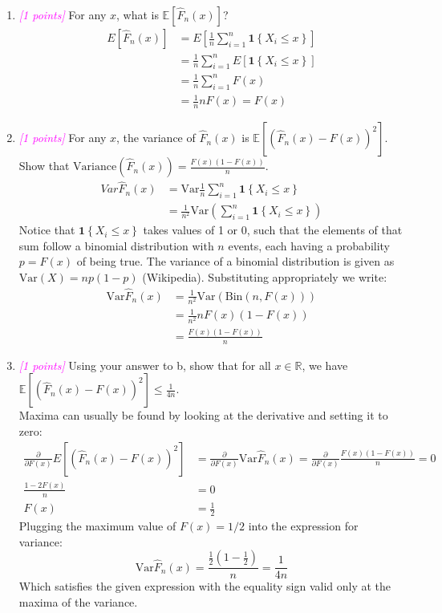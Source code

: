 \documentclass{article}
\newcommand{\field}[1]{\mathbb{#1}}
\newcommand{\1}{\mathbf{1}}
\newcommand{\E}{\mathbb{E}}
\newcommand{\R}{\field{R}} %
\newcommand{\points}[1]{\small\textcolor{magenta}{\emph{[#1 points]}} \normalsize}
\begin{document}
  \begin{enumerate}
  
  \item \points{1} For any $x$, what is $\E[ \widehat{F}_n(x) ]$?
  \begin{align*}
      E[\hat F_n(x)] &= E\left[ \frac{1}{n}\sum_{i=1}^n \mathbf{1} \left\{ X_i \leq x \right\} \right] \\
      &= \frac{1}{n}\sum_{i=1}^n E\left[\mathbf{1} \left\{ X_i \leq x \right\} \right] \\
      &= \frac{1}{n}\sum_{i=1}^n F(x) \\
      &= \frac{1}{n} n F(x) = F(x)
  \end{align*}  
  
  \item \points{1} For any $x$, the variance of $\widehat{F}_n(x)$ is $\E[ ( \widehat{F}_n(x) - F(x) )^2 ]$. Show that $\textrm{Variance}(\widehat{F}_n(x)) = \frac{F(x)(1-F(x))}{n}$. \\
  \begin{align*}
  {Var}\hat F_n(x) &= \text{Var} \frac{1}{n}\sum_{i=1}^n \mathbf{1} \left\{ X_i \leq x \right\} \\
      &= \frac{1}{n^2}\text{Var}\left(\sum_{i=1}^n \mathbf{1} \left\{ X_i \leq x \right\}\right)
  \end{align*}  
  Notice that $\mathbf{1}\left\{X_i\leq x\right\}$ takes values of 1 or 0, such that the elements of that sum follow a binomial distribution with $n$ events, each having a probability $p=F(x)$ of being true. The variance of a binomial distribution is given as $\text{Var}(X)=np(1-p)$ (Wikipedia). Substituting appropriately we write: 
  \begin{align*}
  \text{Var}\hat F_n(x) &= \frac{1}{n^2}\text{Var}(\text{Bin}(n, F(x))) \\
  &= \frac{1}{n^2}nF(x)\left(1-F(x)\right) \\
  &= \frac{F(x)\left(1-F(x)\right)}{n} 
  \end{align*} 
  
  \item \points{1} Using your answer to b, show that
    for all $x\in \R$, we have  $\displaystyle \E[ ( \widehat{F}_n(x) - F(x) )^2 ] \leq \tfrac{1}{4n}$.\\
    Maxima can usually be found by looking at the derivative and setting it to zero:
    \begin{align*}
         \frac{\partial}{\partial F(x)} E[ ( \widehat{F}_n(x) - F(x) )^2 ] &= \frac{\partial}{\partial F(x)} \text{Var} \widehat{F}_n(x) = \frac{\partial}{\partial F(x)} \frac{F(x)\left(1-F(x)\right)}{n} = 0 \\
          \frac{1 - 2F(x)}{n} &= 0 \\
          F(x) &= \frac{1}{2}
    \end{align*} 
    Plugging the maximum value of $F(x)=1/2$ into the expression for variance:
    $$\text{Var} \widehat{F}_n(x) = \frac{\frac{1}{2}\left(1-\frac{1}{2}\right)}{n} = \frac{1}{4n} $$
    Which satisfies the given expression with the equality sign valid only at the maxima of the variance. 
    \end{enumerate}
\end{document}
